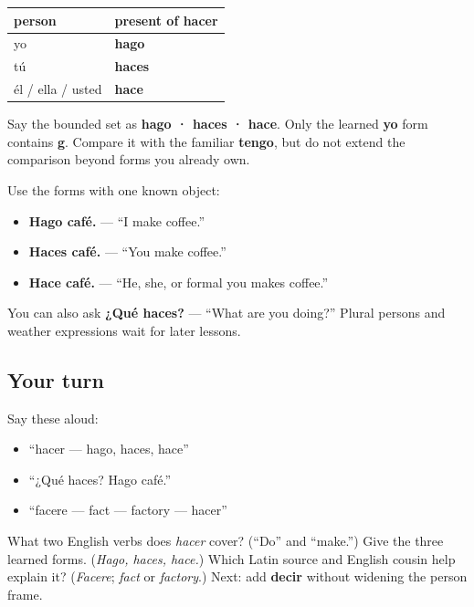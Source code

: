 \begin{grammarlens}[title={Grammar Lens: only the three singular forms}]
\noindent
\begin{tabularx}{\linewidth}{@{}>{\raggedright\arraybackslash}X>{\raggedright\arraybackslash}X@{}}
\toprule
\textbf{person} & \textbf{present of \textbf{hacer}} \\
\midrule
yo & \textbf{hago} \\
tú & \textbf{haces} \\
él / ella / usted & \textbf{hace} \\
\bottomrule
\end{tabularx}

Say the bounded set as \textbf{hago · haces · hace}. Only the learned \textbf{yo} form contains \textbf{g}. Compare it with the familiar \textbf{tengo}, but do not extend the comparison beyond forms you already own.

Use the forms with one known object:

\begin{itemize}
\raggedright
  \item \textbf{Hago café.} — “I make coffee.”
  \item \textbf{Haces café.} — “You make coffee.”
  \item \textbf{Hace café.} — “He, she, or formal you makes coffee.”
\end{itemize}

You can also ask \textbf{¿Qué haces?} — “What are you doing?” Plural persons and weather expressions wait for later lessons.
\end{grammarlens}

\subsection*{Your turn}
Say these aloud:

\begin{itemize}
\raggedright
  \item “hacer — hago, haces, hace”
  \item “¿Qué haces? Hago café.”
  \item “facere — fact — factory — hacer”
\end{itemize}

\begin{tcolorbox}[breakable,colback=teal!4,colframe=teal!35!black,title={Before you move on}]
What two English verbs does \emph{hacer} cover? (“Do” and “make.”) Give the three learned forms. (\emph{Hago, haces, hace.}) Which Latin source and English cousin help explain it? (\emph{Facere}; \emph{fact} or \emph{factory}.) Next: add \textbf{decir} without widening the person frame.
\end{tcolorbox}
